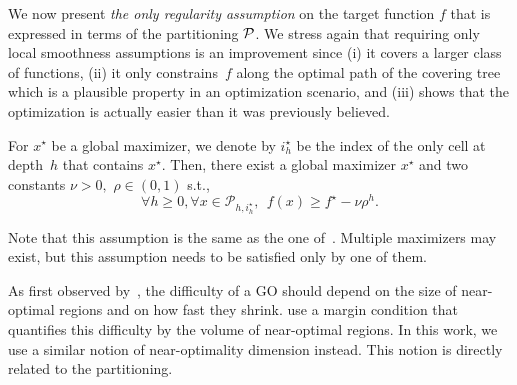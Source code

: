We now present \emph{the only regularity assumption} on the target function $f$ that is expressed in terms of the partitioning $\mathcal{P}$. We stress again that requiring only local smoothness assumptions is an improvement since (i) it covers a larger class of functions, (ii) it only constrains~$f$ along the optimal path of the covering tree which is a plausible property in an optimization scenario, and (iii) shows that the optimization is actually easier than it was previously believed.
\begin{assumption}\label{ass1}
For $x^\star$ be a global maximizer, we denote by $i_h^\star$ be the index of the only cell at depth~$h$ that contains $x^\star$.
Then, there exist a global maximizer $x^\star$ and two constants $\nu > 0,$ $\rho\in (0,1)$ s.t.,
\[
	\forall h\geq 0, \forall x\in\mathcal{P}_{h,i_h^\star}, \ \  f(x)\geq f^\star - \nu\rho^h.
\]
\end{assumption}
Note that this assumption is the same as the one of~\cite{grill2015poo}. Multiple maximizers may exist, but this assumption  needs to be satisfied only by one of them.

As first observed by~\cite{auer2007improved}, the difficulty of a GO  should depend on the size of near-optimal regions and on how fast they shrink. \citet{auer2007improved} use a margin condition that quantifies this difficulty by the volume of near-optimal regions. In this work, we use a similar notion of near-optimality dimension instead. This notion is directly related to the partitioning.

